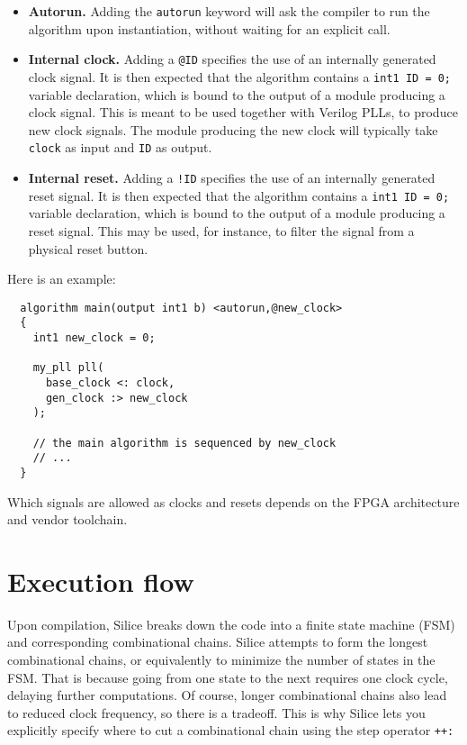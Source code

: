 \documentclass[a4]{article}
\newcommand\verilog{Verilog}
\newcommand\silice{Silice}
\begin{document}
\begin{itemize}
	\item \textbf{Autorun.} Adding the \texttt{autorun} keyword will ask the compiler to run the algorithm upon instantiation, without waiting for an explicit call.
	\item \textbf{Internal clock.} Adding a \texttt{@ID} specifies the use of an internally generated clock signal. It is then expected that the algorithm contains a \texttt{int1 ID = 0;} variable declaration, which is bound to the output of a module producing a clock signal. This is meant to be used together with \verilog{} PLLs, to produce new clock signals. The module producing the new clock will typically take \texttt{clock} as input and \texttt{ID}
	as output.
	\item \textbf{Internal reset.} Adding a \texttt{!ID} specifies the use of an internally generated reset signal. It is then expected that the algorithm contains a \texttt{int1 ID = 0;} variable declaration, which is bound to the output of a module producing a reset signal. This may be used, for instance, to filter the signal from a physical reset button.
\end{itemize}

Here is an example:
\begin{verbatim}
  algorithm main(output int1 b) <autorun,@new_clock>
  {
    int1 new_clock = 0;

    my_pll pll(
      base_clock <: clock,
      gen_clock :> new_clock
    );

    // the main algorithm is sequenced by new_clock
    // ...
  }
\end{verbatim}

Which signals are allowed as clocks and resets depends on the FPGA architecture
and vendor toolchain.



\section{Execution flow}
\label{sec:execflow}

Upon compilation, \silice{} breaks down the code into a finite state machine (FSM) and corresponding combinational chains.
%
\silice{} attempts to form the longest combinational chains, or equivalently
to minimize the number of states in the FSM. That is because going from one state 
to the next requires one clock cycle, delaying further computations. 
%
Of course, longer combinational chains also lead to reduced clock frequency, so
there is a tradeoff. This is why \silice{} lets you explicitly specify where to cut a combinational chain using the step operator \texttt{++:}
\end{document}
